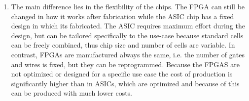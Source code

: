 \documentclass[a4paper]{scrartcl}
\begin{document}
\begin{enumerate}[label=(\alph*)]
    \item 
    The main difference lies in the flexibility of the chips. The FPGA can still be changed in how it works after fabrication while the ASIC chip has a fixed design in which its fabricated. 
    The ASIC requires maximum effort during the design, but can be tailored specifically to the use-case because standard cells can be freely combined, thus chip size and number of cells are variable.
    In contrast, FPGAs are manufactured always the same, i.e. the number of gates and wires is fixed, but they can be reprogrammed.
    Because the FPGAS are not optimized or designed for a specific use case the cost of production is significantly higher than in ASICs, which are optimized and because of this can be produced with much lower costs.
    
\end{enumerate}
\end{document}
